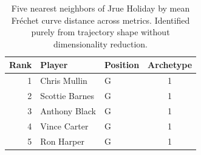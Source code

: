 \begin{table}[htbp]
  \centering\small
  \begin{tabular}{rllc}
    \toprule
    Rank & Player & Position & Archetype \\
    \midrule
    1 & Chris Mullin & G & 1 \\
    2 & Scottie Barnes & G & 1 \\
    3 & Anthony Black & G & 1 \\
    4 & Vince Carter & G & 1 \\
    5 & Ron Harper & G & 1 \\
    \bottomrule
  \end{tabular}
  \caption{Five nearest neighbors of Jrue Holiday by mean Fr\'{e}chet curve distance across metrics. Identified purely from trajectory shape without dimensionality reduction.}
  \label{tab:Jrue_Holiday_frechet_curve_neighbors}
\end{table}

